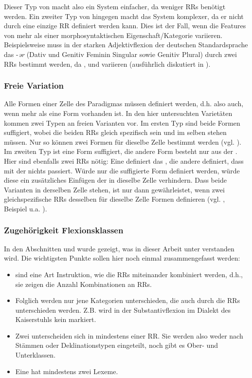 Dieser Typ von  macht also ein System einfacher, da weniger RRs benötigt werden. Ein zweiter Typ von  hingegen macht das System komplexer, da er nicht durch eine einzige RR definiert werden kann. Dies ist der Fall, wenn die Features von mehr als einer morphosyntaktischen Eigenschaft/Kategorie variieren. Beispielsweise muss in der starken Adjektivflexion der deutschen Standardsprache das  -\textit{ər} (Dativ und Genitiv Feminin Singular sowie Genitiv Plural) durch zwei RRs bestimmt werden, da ,  und  variieren (ausführlich diskutiert in ).

\subsubsection{Freie Variation}\label{5.7.3.4}

Alle Formen einer Zelle des Paradigmas müssen definiert werden, d.h. also auch, wenn mehr als eine Form vorhanden ist. In den hier untersuchten Varietäten kommen zwei Typen an freien Varianten vor. Im ersten Typ sind beide Formen suffigiert, wobei die beiden RRs gleich spezifisch sein und im selben  stehen müssen. Nur so können zwei Formen für dieselbe Zelle bestimmt werden (vgl. ). Im zweiten Typ ist eine Form suffigiert, die andere Form besteht nur aus der . Hier sind ebenfalls zwei RRs nötig: Eine definiert das , die andere definiert, dass mit der  nichts passiert. Würde nur die suffigierte Form definiert werden, würde diese ein zusätzliches Einfügen der  in dieselbe Zelle verhindern. Dass beide Varianten in derselben Zelle stehen, ist nur dann gewährleistet, wenn zwei gleichspezifische RRs desselben  für dieselbe Zelle Formen definieren (vgl. , Beispiel u.a. ).

\subsubsection{Zugehörigkeit Flexionsklassen}\label{5.7.3.5}

In den Abschnitten  und  wurde gezeigt, was in dieser Arbeit unter  verstanden wird. Die wichtigsten Punkte sollen hier noch einmal zusammengefasst werden:

\begin{itemize}
\item 
{} sind eine Art Instruktion, wie die RRs miteinander kombiniert werden, d.h., sie zeigen die Anzahl Kombinationen an RRs.
\item 
Folglich werden nur jene Kategorien unterschieden, die auch durch die RRs unterschieden werden. Z.B. wird in der Substantivflexion im Dialekt des Kaiserstuhls kein  markiert.
\item 
Zwei  unterscheiden sich in mindestens einer RR. Sie werden also weder nach Stämmen oder Deklinationstypen eingeteilt, noch gibt es Ober- und Unterklassen.
\item 
Eine  hat mindestens zwei Lexeme.
\end{itemize}

